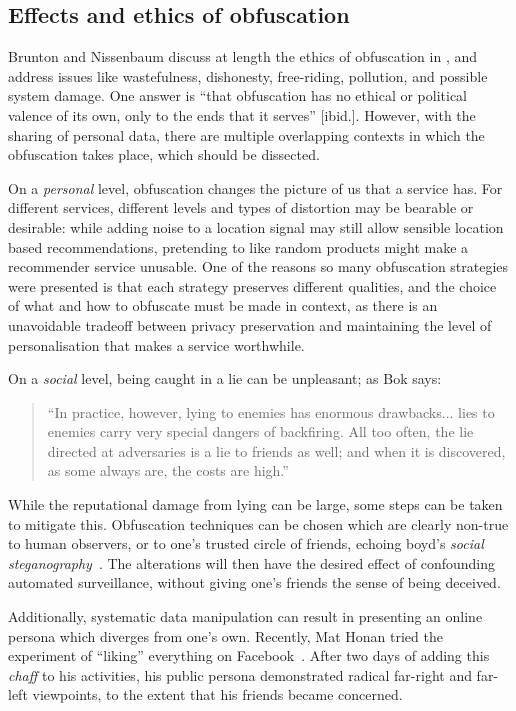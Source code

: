 \documentclass{IOS-Book-Article}     %
\newcommand{\tbox}[3][red]{{
\color{#1}\noindent{
   \fbox{\scriptsize{ {\bf #2} \textsl{#3}}}
   \vspace{2pt}
}
}}
\newcommand{\todo}[1]{\tbox{TODO:}{#1}}
\begin{document}
\subsection{Effects and ethics of obfuscation}
Brunton and Nissenbaum discuss at length the ethics of obfuscation in
\cite{brunton2011vernacular}, and address issues like wastefulness, dishonesty,
free-riding, pollution, and possible system damage. One answer is ``that
obfuscation has no ethical or political valence of its own, only to the ends
that it serves'' [ibid.]. However, with the sharing of personal data, there are
multiple overlapping contexts in which the obfuscation takes place, which should
be dissected.

On a \emph{personal} level, obfuscation changes the picture of us that a service
has. For different services, different levels and types of distortion may be
bearable or desirable: while adding noise to a location signal may still allow
sensible location based recommendations, pretending to like random products
might make a recommender service unusable. 
 One of the reasons so many obfuscation strategies were presented is
that each strategy preserves different qualities, and the choice of what and how
to obfuscate must be made in context, as there is an unavoidable tradeoff
between privacy preservation and maintaining the level of personalisation that
makes a service worthwhile.

On a \emph{social} level, being caught in a lie can be unpleasant; as
Bok says:
\begin{quote}
``In practice, however, lying to enemies has enormous drawbacks...  lies to
enemies carry very special dangers of backfiring. All too often, the lie
directed at adversaries is a lie to friends as well; and when it is discovered,
as some always are, the costs are high.'' \cite[p. 141]{bok1978lying} 
\end{quote}
While the reputational damage from lying can be large, some steps can be taken
to mitigate this. Obfuscation techniques can be chosen which are
clearly non-true to human observers, or to one's trusted circle of friends,
echoing boyd's \emph{social steganography}~\cite{boyd2012Networked}. The
alterations will then have the desired effect of confounding automated
surveillance, without giving one's friends the sense of being deceived.

Additionally, systematic data manipulation can result in presenting an online
persona which diverges from one's own. Recently, Mat Honan tried the experiment
of ``liking'' everything on Facebook~\cite{honan2014Facebook}. After two days of
adding this \emph{chaff} to his activities, his public persona demonstrated
radical far-right and far-left viewpoints, to the extent that his friends became
concerned.
\end{document}
